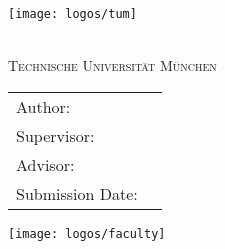\thispagestyle{empty}

\vspace{40mm}
\begin{center}
  \texttt{[image: logos/tum]}

  \vspace{5mm}
  \Huge \textsc{\getFaculty{}}\\
  \vspace{5mm}
  \Large \textsc{Technische Universität München}\\
  \vspace{1mm}
\end{center}

\vspace{15mm}

\begin{center}
  {\Large \getDoctype{}}

  \vspace{20mm}

  {\huge\bfseries \getTitle{}}

  \vspace{10mm}

  {\huge\bfseries \getTitleGer{}}

  \vspace{15mm}

  \begin{tabular}{l l}
    Author: & \getAuthor{} \\
    Supervisor: & \getSupervisor{} \\
    Advisor: & \getAdvisor{} \\
    Submission Date: & \getSubmissionDate{} \\
  \end{tabular}

  \vspace{7mm}

  \texttt{[image: logos/faculty]}
\end{center}

\cleardoublepage{}
